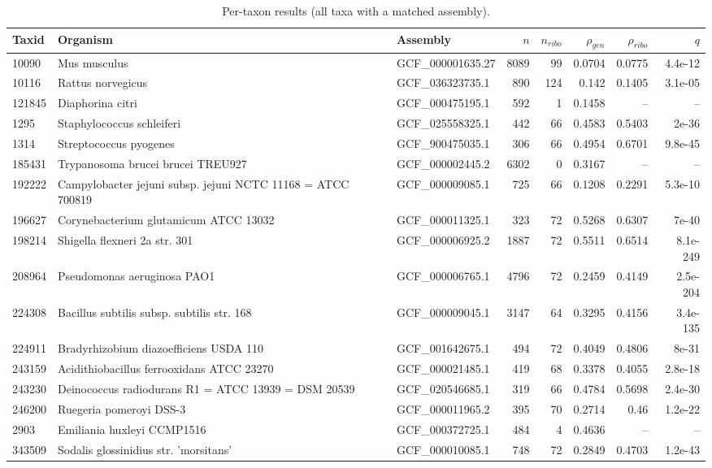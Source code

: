 {\scriptsize\begin{longtable}{lp{4.3cm}lrrrrr}\caption{Per-taxon results (all taxa with a matched assembly).}\\\hline Taxid & Organism & Assembly & $n$ & $n_{ribo}$ & $\rho_{gen}$ & $\rho_{ribo}$ & $q$\\\hline\endhead
10090 & Mus musculus & GCF\_000001635.27 & 8089 & 99 & 0.0704 & 0.0775 & 4.4e-12\\
10116 & Rattus norvegicus & GCF\_036323735.1 & 890 & 124 & 0.142 & 0.1405 & 3.1e-05\\
121845 & Diaphorina citri & GCF\_000475195.1 & 592 & 1 & 0.1458 & -- & --\\
1295 & Staphylococcus schleiferi & GCF\_025558325.1 & 442 & 66 & 0.4583 & 0.5403 & 2e-36\\
1314 & Streptococcus pyogenes & GCF\_900475035.1 & 306 & 66 & 0.4954 & 0.6701 & 9.8e-45\\
185431 & Trypanosoma brucei brucei TREU927 & GCF\_000002445.2 & 6302 & 0 & 0.3167 & -- & --\\
192222 & Campylobacter jejuni subsp. jejuni NCTC 11168 = ATCC 700819 & GCF\_000009085.1 & 725 & 66 & 0.1208 & 0.2291 & 5.3e-10\\
196627 & Corynebacterium glutamicum ATCC 13032 & GCF\_000011325.1 & 323 & 72 & 0.5268 & 0.6307 & 7e-40\\
198214 & Shigella flexneri 2a str. 301 & GCF\_000006925.2 & 1887 & 72 & 0.5511 & 0.6514 & 8.1e-249\\
208964 & Pseudomonas aeruginosa PAO1 & GCF\_000006765.1 & 4796 & 72 & 0.2459 & 0.4149 & 2.5e-204\\
224308 & Bacillus subtilis subsp. subtilis str. 168 & GCF\_000009045.1 & 3147 & 64 & 0.3295 & 0.4156 & 3.4e-135\\
224911 & Bradyrhizobium diazoefficiens USDA 110 & GCF\_001642675.1 & 494 & 72 & 0.4049 & 0.4806 & 8e-31\\
243159 & Acidithiobacillus ferrooxidans ATCC 23270 & GCF\_000021485.1 & 419 & 68 & 0.3378 & 0.4055 & 2.8e-18\\
243230 & Deinococcus radiodurans R1 = ATCC 13939 = DSM 20539 & GCF\_020546685.1 & 319 & 66 & 0.4784 & 0.5698 & 2.4e-30\\
246200 & Ruegeria pomeroyi DSS-3 & GCF\_000011965.2 & 395 & 70 & 0.2714 & 0.46 & 1.2e-22\\
2903 & Emiliania huxleyi CCMP1516 & GCF\_000372725.1 & 484 & 4 & 0.4636 & -- & --\\
343509 & Sodalis glossinidius str. 'morsitans' & GCF\_000010085.1 & 748 & 72 & 0.2849 & 0.4703 & 1.2e-43\\

\end{longtable}}

